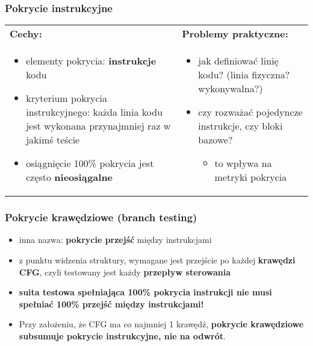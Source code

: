 \documentclass[../main.tex]{subfiles}
\begin{document}
    \subsubsection{Pokrycie instrukcyjne}
    \begin{table}[H]
        \begin{center}
            \begin{tabular}{p{8cm} p{8cm}}
                \textbf{Cechy:} & \textbf{ Problemy praktyczne:} \\
                \begin{itemize}
                    \item elementy pokrycia: \textbf{instrukcje} kodu
                    \item kryterium pokrycia instrukcyjnego: każda linia kodu jest wykonana
                    przynajmniej raz w jakimś teście
                    \item osiągnięcie 100\% pokrycia jest często \textbf{nieosiągalne}
                \end{itemize}
                &
                \begin{itemize}
                    \item jak definiować linię kodu? (linia fizyczna? wykonywalna?)
                    \item czy rozważać pojedyncze instrukcje, czy bloki bazowe?
                    \begin{itemize}
                        \item to wpływa na metryki pokrycia
                    \end{itemize}
                \end{itemize}
            \end{tabular}
        \end{center}
    \end{table}

    \subsubsection{Pokrycie krawędziowe (branch testing)}
    \begin{itemize}
        \item inna nazwa: \textbf{pokrycie przejść} między instrukcjami
        \item z punktu widzenia struktury, wymagane jest przejście po każdej
        \textbf{krawędzi CFG}, czyli testowany jest każdy \textbf{przepływ sterowania}
        \item \textbf{suita testowa spełniająca 100\% pokrycia instrukcji nie musi
        spełniać 100\% przejść między instrukcjami!}
        \item Przy założeniu, że CFG ma co najmniej 1 krawędź, \textbf{pokrycie
        krawędziowe subsumuje pokrycie instrukcyjne, nie na odwrót}.
    \end{itemize}
\end{document}
